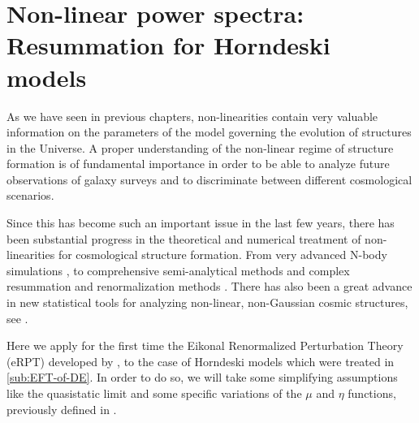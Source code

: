 \chapter{Non-linear power spectra: Resummation for Horndeski models \label{chap:nonlinear}} %





As we have seen in previous chapters, non-linearities contain very valuable information
on the parameters of the model governing the evolution of structures in the Universe.
A proper understanding of the non-linear regime of structure formation is of fundamental 
importance in order to be able to analyze future observations of galaxy surveys and 
to discriminate between different cosmological scenarios.

Since this has become such an important issue in the last few years, there has been 
substantial progress in the theoretical and numerical
treatment of non-linearities for cosmological structure formation. 
From very advanced N-body simulations
, to
comprehensive semi-analytical methods  and complex resummation and renormalization methods . There has also been a great advance in
new statistical tools for analyzing non-linear, non-Gaussian cosmic structures, see
.

Here we apply for the first time the Eikonal Renormalized Perturbation Theory (eRPT) developed
by \cite{anselmi_nonlinear_2012},  to the 
case of Horndeski models which were treated in \cref{sub:EFT-of-DE}.
In order to do so, we will take some simplifying assumptions like the quasistatic limit and
some specific variations of the $\mu$ and $\eta$ functions, previously
defined in .


